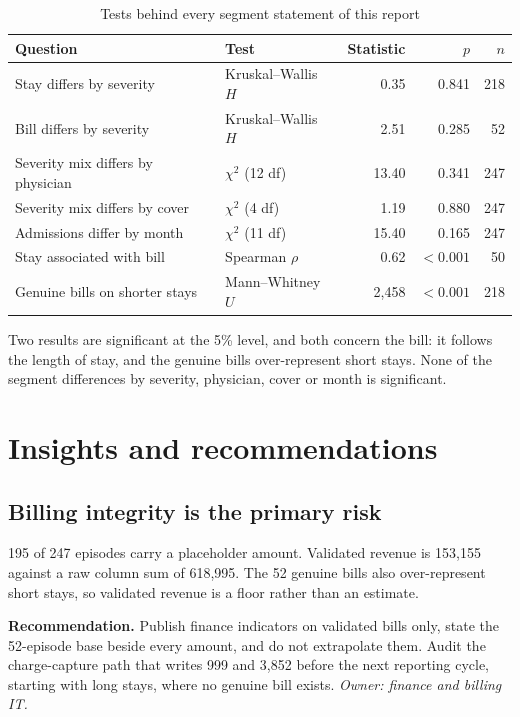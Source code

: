 \documentclass[12pt,a4paper]{article}
\begin{document}
\begin{table}[H]\centering\singlespacing
\caption{Tests behind every segment statement of this report}
\small
\begin{tabular}{@{}llrrr@{}}
\toprule
\textbf{Question} & \textbf{Test} & \textbf{Statistic} & \textbf{$p$} & \textbf{$n$} \\ \midrule
Stay differs by severity & Kruskal--Wallis $H$ & 0.35 & 0.841 & 218 \\
Bill differs by severity & Kruskal--Wallis $H$ & 2.51 & 0.285 & 52 \\
Severity mix differs by physician & $\chi^2$ (12 df) & 13.40 & 0.341 & 247 \\
Severity mix differs by cover & $\chi^2$ (4 df) & 1.19 & 0.880 & 247 \\
Admissions differ by month & $\chi^2$ (11 df) & 15.40 & 0.165 & 247 \\
Stay associated with bill & Spearman $\rho$ & 0.62 & $<0.001$ & 50 \\
Genuine bills on shorter stays & Mann--Whitney $U$ & 2{,}458 & $<0.001$ & 218 \\
\bottomrule
\end{tabular}
\end{table}

Two results are significant at the 5\% level, and both concern the bill: it follows
the length of stay, and the genuine bills over-represent short stays. None of the
segment differences by severity, physician, cover or month is significant.

\section{Insights and recommendations}

\subsection{Billing integrity is the primary risk}

195 of 247 episodes carry a placeholder amount. Validated revenue is 153{,}155
against a raw column sum of 618{,}995. The 52 genuine bills also over-represent short
stays, so validated revenue is a floor rather than an estimate.

\textbf{Recommendation.} Publish finance indicators on validated bills only, state
the 52-episode base beside every amount, and do not extrapolate them. Audit the
charge-capture path that writes 999 and 3{,}852 before the next reporting cycle,
starting with long stays, where no genuine bill exists. \emph{Owner: finance and
billing IT.}
\end{document}
